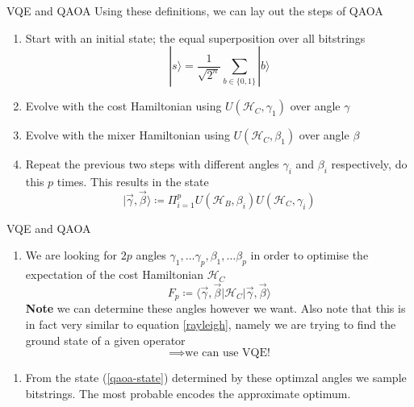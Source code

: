 \documentclass{beamer}
\renewcommand{\exp}[1]{\langle #1 \rangle} %
\begin{document}
\begin{frame}{VQE and QAOA}
Using these definitions, we can lay out the steps of QAOA
\begin{enumerate}
	\item Start with an initial state; the equal superposition over all bitstrings
	\begin{equation}
		|s\rangle = \frac{1}{\sqrt{2^n}}\sum_{b\in \{0,1\}}|b\rangle
	\end{equation}
	\item Evolve with the cost Hamiltonian using $U(\mathcal{H}_C,\gamma_1)$ over angle $\gamma$
	\item Evolve with the mixer Hamiltonian using $U(\mathcal{H}_C,\beta_1)$ over angle $\beta$
	\item Repeat the previous two steps with different angles $\gamma_i$ and $\beta_i$ respectively, do this $p$ times. This results in the state
	\begin{equation}
		|\vec{\gamma},\vec{\beta}\rangle \coloneq \Pi_{i=1}^p U(\mathcal{H}_B,\beta_i) U(\mathcal{H}_C,\gamma_i)
		\label{qaoa-state}
	\end{equation}
\end{enumerate}
\end{frame}

\begin{frame}{VQE and QAOA}
\begin{enumerate}[5]
	\item We are looking for $2p$ angles $\gamma_1, \dots \gamma_p, \beta_1, \dots \beta_p$ in order to optimise the expectation of the cost Hamiltonian $\mathcal{H}_C$
	\begin{equation}
		F_p \coloneq \exp{\vec{\gamma},\vec{\beta}|\mathcal{H}_C|\vec{\gamma},\vec{\beta}}
	\end{equation}
	\textbf{Note} we can determine these angles however we want. Also note that this is in fact very similar to equation \ref{rayleigh}, namely we are trying to find the ground state of a given operator $$\implies \text{we can use VQE!}$$ 
	
\end{enumerate}
\begin{enumerate}[6]
	\item From the state (\ref{qaoa-state}) determined by these optimzal angles we sample bitstrings. The most probable encodes the approximate optimum.\\~\\
	
	
\end{enumerate}
\end{frame}
\end{document}
